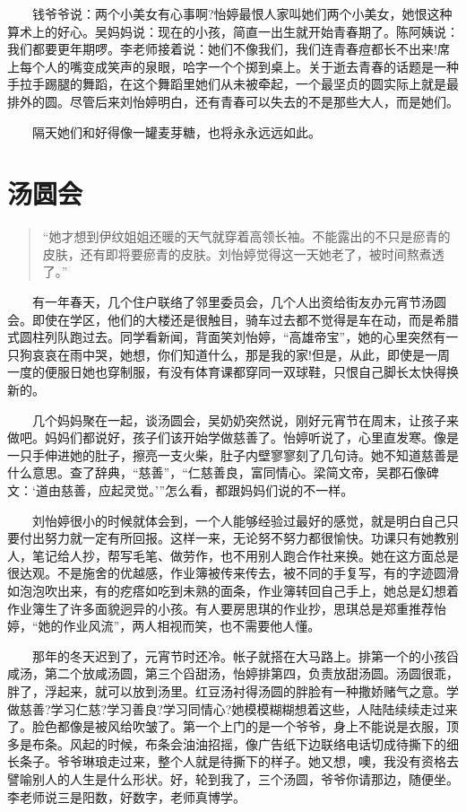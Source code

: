 \documentclass[12pt,UTF8]{ctexbook}
\begin{document}
　　钱爷爷说：两个小美女有心事啊?怡婷最恨人家叫她们两个小美女，她恨这种算术上的好心。吴妈妈说：现在的小孩，简直一出生就开始青春期了。陈阿姨说：我们都要更年期啰。李老师接着说：她们不像我们，我们连青春痘都长不出来!席上每个人的嘴变成笑声的泉眼，哈字一个个掷到桌上。关于逝去青春的话题是一种手拉手踢腿的舞蹈，在这个舞蹈里她们从未被牵起，一个最坚贞的圆实际上就是最排外的圆。尽管后来刘怡婷明白，还有青春可以失去的不是那些大人，而是她们。

　　隔天她们和好得像一罐麦芽糖，也将永永远远如此。

\hypertarget{ux6c64ux5706ux4f1a}{%
\section*{汤圆会}\label{ux6c64ux5706ux4f1a}}

\begin{quote}
\enquote{她才想到伊纹姐姐还暖的天气就穿着高领长袖。不能露出的不只是瘀青的皮肤，还有即将要瘀青的皮肤。刘怡婷觉得这一天她老了，被时间熬煮透了。}
\end{quote}

　　有一年春天，几个住户联络了邻里委员会，几个人出资给街友办元宵节汤圆会。即使在学区，他们的大楼还是很触目，骑车过去都不觉得是车在动，而是希腊式圆柱列队跑过去。同学看新闻，背面笑刘怡婷，\enquote{高雄帝宝}，她的心里突然有一只狗哀哀在雨中哭，她想，你们知道什么，那是我的家!但是，从此，即使是一周一度的便服日她也穿制服，有没有体育课都穿同一双球鞋，只恨自己脚长太快得换新的。

　　几个妈妈聚在一起，谈汤圆会，吴奶奶突然说，刚好元宵节在周末，让孩子来做吧。妈妈们都说好，孩子们该开始学做慈善了。怡婷听说了，心里直发寒。像是一只手伸进她的肚子，擦亮一支火柴，肚子内壁寥寥刻了几句诗。她不知道慈善是什么意思。查了辞典，\enquote{慈善}，\enquote{仁慈善良，富同情心。梁简文帝，吴郡石像碑文：\enquote{道由慈善，应起灵觉。}}怎么看，都跟妈妈们说的不一样。

　　刘怡婷很小的时候就体会到，一个人能够经验过最好的感觉，就是明白自己只要付出努力就一定有所回报。这样一来，无论努不努力都很愉快。功课只有她教别人，笔记给人抄，帮写毛笔、做劳作，也不用别人跑合作社来换。她在这方面总是很达观。不是施舍的优越感，作业簿被传来传去，被不同的手复写，有的字迹圆滑如泡泡吹出来，有的疙瘩如吃到未熟的面条，作业簿转回自己手上，她总是幻想着作业簿生了许多面貌迥异的小孩。有人要房思琪的作业抄，思琪总是郑重推荐怡婷，\enquote{她的作业风流}，两人相视而笑，也不需要他人懂。

　　那年的冬天迟到了，元宵节时还冷。帐子就搭在大马路上。排第一个的小孩舀咸汤，第二个放咸汤圆，第三个舀甜汤，怡婷排第四，负责放甜汤圆。汤圆很乖，胖了，浮起来，就可以放到汤里。红豆汤衬得汤圆的胖脸有一种撒娇赌气之意。学做慈善?学习仁慈?学习善良?学习同情心?她模模糊糊想着这些，人陆陆续续走过来了。脸色都像是被风给吹皱了。第一个上门的是一个爷爷，身上不能说是衣服，顶多是布条。风起的时候，布条会油油招摇，像广告纸下边联络电话切成待撕下的细长条子。爷爷琳琅走过来，整个人就是待撕下的样子。她又想，噢，我没有资格去譬喻别人的人生是什么形状。好，轮到我了，三个汤圆，爷爷你请那边，随便坐。李老师说三是阳数，好数字，老师真博学。
\end{document}
